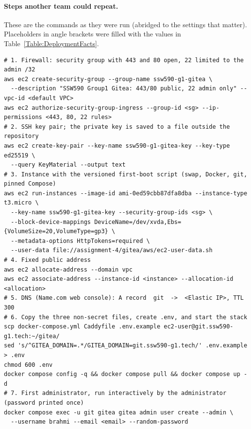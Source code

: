 \inputminted{yaml}{../gitea/docker-compose.yml}

\inputminted{text}{../gitea/Caddyfile}

\paragraph{Steps another team could repeat.}
These are the commands as they were run (abridged to the settings that matter).
Placeholders in angle brackets were filled with the values in
Table~\ref{Table:DeploymentFacts}.

\begin{verbatim}
# 1. Firewall: security group with 443 and 80 open, 22 limited to the admin /32
aws ec2 create-security-group --group-name ssw590-g1-gitea \
  --description "SSW590 Group1 Gitea: 443/80 public, 22 admin only" --vpc-id <default VPC>
aws ec2 authorize-security-group-ingress --group-id <sg> --ip-permissions <443, 80, 22 rules>
# 2. SSH key pair; the private key is saved to a file outside the repository
aws ec2 create-key-pair --key-name ssw590-g1-gitea-key --key-type ed25519 \
  --query KeyMaterial --output text
# 3. Instance with the versioned first-boot script (swap, Docker, git, pinned Compose)
aws ec2 run-instances --image-id ami-0ed59cbb87dfa8dba --instance-type t3.micro \
  --key-name ssw590-g1-gitea-key --security-group-ids <sg> \
  --block-device-mappings DeviceName=/dev/xvda,Ebs={VolumeSize=20,VolumeType=gp3} \
  --metadata-options HttpTokens=required \
  --user-data file://assignment-4/gitea/aws/ec2-user-data.sh
# 4. Fixed public address
aws ec2 allocate-address --domain vpc
aws ec2 associate-address --instance-id <instance> --allocation-id <allocation>
# 5. DNS (Name.com web console): A record  git  ->  <Elastic IP>, TTL 300
# 6. Copy the three non-secret files, create .env, and start the stack
scp docker-compose.yml Caddyfile .env.example ec2-user@git.ssw590-g1.tech:~/gitea/
sed 's/^GITEA_DOMAIN=.*/GITEA_DOMAIN=git.ssw590-g1.tech/' .env.example > .env
chmod 600 .env
docker compose config -q && docker compose pull && docker compose up -d
# 7. First administrator, run interactively by the administrator (password printed once)
docker compose exec -u git gitea gitea admin user create --admin \
  --username brahmi --email <email> --random-password
\end{verbatim}

